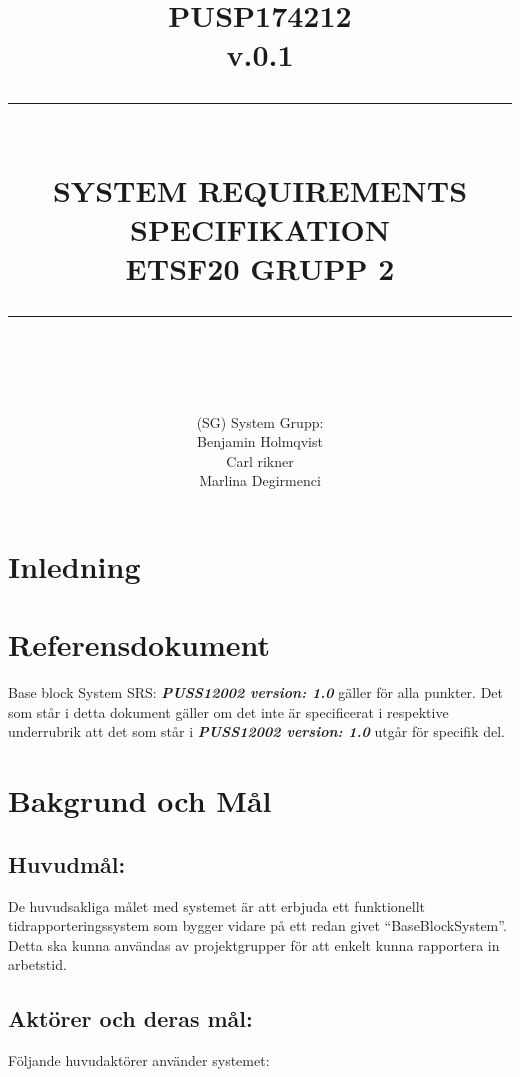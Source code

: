 \documentclass[paper=a4, fontsize=11pt,twoside]{article}
\title{ 														%
	\documentNumber{#1}											%
	\documentVersion{#2}											%
	\HRule{0.5pt} \\ %
	\LARGE \textbf{\uppercase{#3}} \\  									%
	\large \textbf{\uppercase{ETSF20 Grupp 2}}							%
	\HRule{2pt} \\ [0.5cm]      	%
	\normalsize          		%
	}															%
\author{#4}													%
\date{}                                           	%
\newcommand{\HRule}[1]{\rule{\linewidth}{#1}}   							%
\newcommand{\documentNumber}[1]{\centering PUSP1742#1 \\[1.0cm]}	 		%
\newcommand{\documentVersion}[1]{\centering \small{v.#1} \\[1.0cm]}	 		%
\newcommand{\grouptitlepage}[4]{										%
	\title{ 														%
	\documentNumber{#1}											%
	\documentVersion{#2}											%
	\HRule{0.5pt} \\ %
	\LARGE \textbf{\uppercase{#3}} \\  									%
	\large \textbf{\uppercase{ETSF20 Grupp 2}}							%
	\HRule{2pt} \\ [0.5cm]      	%
	\normalsize          		%
	}															%
	\author{#4}													%
	\maketitle														%
	\tableofcontents												%
	\thispagestyle{empty} 											%
	\newpage														%
}																%
\begin{document}
\grouptitlepage
{12	}
{0.1}
{System Requirements Specifikation}
{(SG) System Grupp: \\ Benjamin Holmqvist \\ Carl rikner \\Marlina Degirmenci}	
\section{Inledning}
\section{Referensdokument}
Base block System SRS: \textbf{\textit{PUSS12002 version: 1.0}}  gäller för alla punkter. Det som står i detta dokument gäller om det inte är specificerat i respektive underrubrik att det som står i \textbf{\textit{PUSS12002 version: 1.0}}  utgår för specifik del.

\section{Bakgrund och Mål}

\subsection{Huvudmål:}
De huvudsakliga målet med systemet är att erbjuda ett funktionellt tidrapporteringssystem som bygger vidare på ett redan givet “BaseBlockSystem”. Detta ska kunna användas av projektgrupper för att enkelt kunna rapportera in arbetstid.
\subsection{Aktörer och deras mål:}
Följande huvudaktörer använder systemet:
\end{document}
